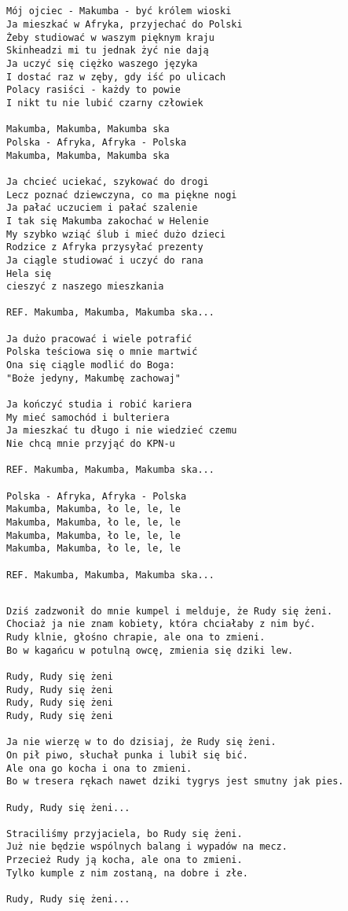 \documentclass[12pt]{article}
\begin{document}
\subsection*{}
\begin{verbatim}
Mój ojciec - Makumba - być królem wioski
Ja mieszkać w Afryka, przyjechać do Polski
Żeby studiować w waszym pięknym kraju
Skinheadzi mi tu jednak żyć nie dają
Ja uczyć się ciężko waszego języka
I dostać raz w zęby, gdy iść po ulicach
Polacy rasiści - każdy to powie
I nikt tu nie lubić czarny człowiek

Makumba, Makumba, Makumba ska
Polska - Afryka, Afryka - Polska
Makumba, Makumba, Makumba ska

Ja chcieć uciekać, szykować do drogi
Lecz poznać dziewczyna, co ma piękne nogi
Ja pałać uczuciem i pałać szalenie
I tak się Makumba zakochać w Helenie
My szybko wziąć ślub i mieć dużo dzieci
Rodzice z Afryka przysyłać prezenty
Ja ciągle studiować i uczyć do rana
Hela się
cieszyć z naszego mieszkania

REF. Makumba, Makumba, Makumba ska...

Ja dużo pracować i wiele potrafić
Polska teściowa się o mnie martwić
Ona się ciągle modlić do Boga:
"Boże jedyny, Makumbę zachowaj"

Ja kończyć studia i robić kariera
My mieć samochód i bulteriera
Ja mieszkać tu długo i nie wiedzieć czemu
Nie chcą mnie przyjąć do KPN-u

REF. Makumba, Makumba, Makumba ska...

Polska - Afryka, Afryka - Polska
Makumba, Makumba, ło le, le, le
Makumba, Makumba, ło le, le, le
Makumba, Makumba, ło le, le, le
Makumba, Makumba, ło le, le, le

REF. Makumba, Makumba, Makumba ska...
\end{verbatim}
\clearpage

\subsection*{}
\begin{verbatim}
Dziś zadzwonił do mnie kumpel i melduje, że Rudy się żeni.
Chociaż ja nie znam kobiety, która chciałaby z nim być.
Rudy klnie, głośno chrapie, ale ona to zmieni.
Bo w kagańcu w potulną owcę, zmienia się dziki lew.

Rudy, Rudy się żeni
Rudy, Rudy się żeni
Rudy, Rudy się żeni
Rudy, Rudy się żeni

Ja nie wierzę w to do dzisiaj, że Rudy się żeni.
On pił piwo, słuchał punka i lubił się bić.
Ale ona go kocha i ona to zmieni.
Bo w tresera rękach nawet dziki tygrys jest smutny jak pies.

Rudy, Rudy się żeni...

Straciliśmy przyjaciela, bo Rudy się żeni.
Już nie będzie wspólnych balang i wypadów na mecz.
Przecież Rudy ją kocha, ale ona to zmieni.
Tylko kumple z nim zostaną, na dobre i złe.

Rudy, Rudy się żeni...
\end{verbatim}
\clearpage
\end{document}
